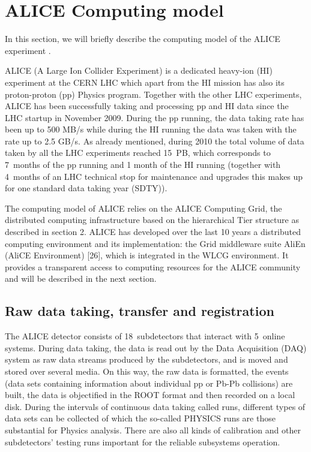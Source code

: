 \section{ALICE Computing model}

In this section, we will briefly describe the computing model of the
ALICE experiment \cite{ALICETDR}.

ALICE (A Large Ion Collider Experiment) is a dedicated heavy-ion
(HI) experiment at the CERN LHC which apart from the HI mission has
also its proton-proton (pp) Physics program. Together with the other
LHC experiments, ALICE has been successfully taking and processing
pp and HI data since the LHC startup in November 2009. During the pp
running, the data taking rate has been up to 500 MB/s while during
the HI running the data was taken with the rate up to 2.5 GB/s. As
already mentioned, during 2010 the total volume of data taken by
all the LHC experiments reached 15~PB, which corresponds to 7~months
of the pp running and 1 month of the HI running (together with
4~months of an LHC technical stop for maintenance and upgrades this
makes up for one standard data taking year (SDTY)).

The computing model of ALICE relies on the ALICE Computing Grid, the
distributed computing infrastructure based on the hierarchical Tier
structure as described in section 2.  ALICE has developed over the
last 10 years a distributed computing environment and its
implementation: the Grid middleware suite AliEn (AliCE Environment)
[26], which is integrated in the WLCG environment. It provides a
transparent access to computing resources for the ALICE community
and will be described in the next section.

\subsection{Raw data taking, transfer and registration}
%
The ALICE detector consists of 18~subdetectors that interact with
5~online systems. During data taking, the data is read out by
the Data Acquisition (DAQ) system as raw data streams produced by
the subdetectors, and is moved and stored over several media. On
this way, the raw data is formatted, the events (data sets
containing information about individual pp or Pb-Pb collisions) are
built, the data is objectified in the ROOT format and then
recorded on a local disk. During the intervals of continuous data
taking called runs, different types of data sets can be collected of
which the so-called PHYSICS runs are those substantial for Physics
analysis. There are also all kinds of calibration and other
subdetectors' testing runs important for the reliable subsystems
operation.

